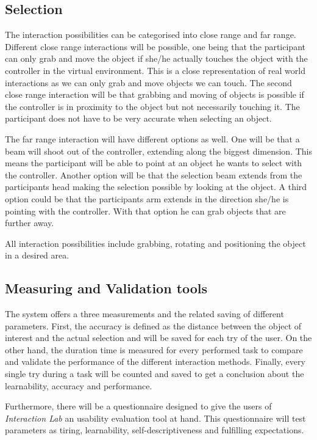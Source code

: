 \documentclass[a4paper, 12pt]{article}
\begin{document}
\subsection{Selection}
The interaction possibilities can be categorised into close range and far range. Different close range interactions will be possible, one being that the participant can only grab and move the object if she/he actually touches the object with the controller in the virtual environment. This is a close representation of real world interactions as we can only grab and move objects we can touch. 
The second close range interaction will be that grabbing and moving of objects is possible if the controller is in proximity to the object but not necessarily touching it. The participant does not have to be very accurate when selecting an object. 

The far range interaction will have different options as well. One will be that a beam will shoot out of the controller, extending along the biggest dimension. This means the participant will be able to point at an object he wants to select with the controller. 
Another option will be that the selection beam extends from the participants head making the selection possible by looking at the object. 
A third option could be that the participants arm extends in the direction she/he is pointing with the controller. With that option he can grab objects that are further away. 

All interaction possibilities include grabbing, rotating and positioning the object in a desired area.  

\subsection{Measuring and Validation tools}

 The system offers a three measurements and the related saving of different parameters. First, the accuracy is defined as the distance between the object of interest and the actual selection and will be saved for each try of the user. On the other hand, the duration time is measured for every performed task to compare and validate the performance of the different interaction methods. 
 Finally, every single try during a task will be counted and saved to get a conclusion about the learnability, accuracy and performance.
 
 Furthermore, there will be a questionnaire designed to give the users of  \textit{Interaction Lab} an usability evaluation tool at hand. This questionnaire will test parameters as tiring, learnability, self-descriptiveness and fulfilling expectations.
\end{document}
